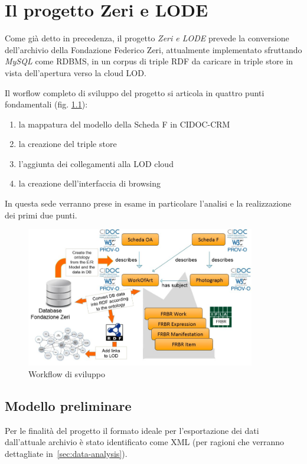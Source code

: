 \chapter{Il progetto Zeri e LODE}

Come già detto in precedenza, il progetto \emph{Zeri e LODE} prevede la conversione dell'archivio della Fondazione Federico Zeri, attualmente implementato sfruttando \emph{MySQL} come RDBMS, in un corpus di triple RDF da caricare in triple store in vista dell'apertura verso la cloud LOD.

Il worflow completo di sviluppo del progetto si articola in quattro punti fondamentali (fig. \ref{fig:zerielode-steps}):
\begin{enumerate}
\item la mappatura del modello della Scheda F in CIDOC-CRM
\item la creazione del triple store
\item l'aggiunta dei collegamenti alla LOD cloud
\item la creazione dell'interfaccia di browsing
\end{enumerate}

In questa sede verranno prese in esame in particolare l'analisi e la realizzazione dei primi due punti.
\begin{figure}
    \centering
    \includegraphics[width=100mm]{images/zeri-steps.png}
	\caption{Workflow di sviluppo}
	\label{fig:zerielode-steps}
\end{figure}

\section{Modello preliminare}

Per le finalità del progetto il formato ideale per l'esportazione dei dati dall'attuale archivio è stato identificato come XML (per ragioni che verranno dettagliate in~\ref{sec:data-analysis}).


